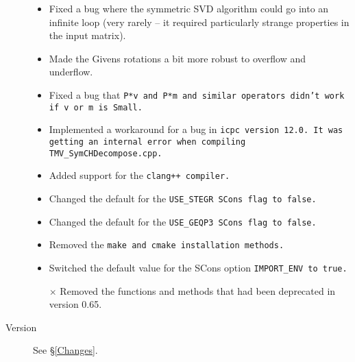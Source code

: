 \begin{description}
\begin{itemize}
\item
Fixed a bug where the symmetric SVD algorithm could go into an infinite loop (very rarely -- it required particularly strange properties in the input matrix).
 
\item
Made the Givens rotations a bit more robust to overflow and underflow.

\item
Fixed a bug that \tt{P*v} and \tt{P*m} and similar operators didn't work if 
\tt{v} or \tt{m} is \tt{Small}.

\item
Implemented a workaround for a bug in \tt{icpc} version 12.0.
It was getting an internal
error when compiling \tt{TMV\_SymCHDecompose.cpp}.  

\item 
Added support for the \tt{clang++} compiler.  

\item
Changed the default for the \tt{USE\_STEGR} SCons flag to \tt{false}.  

\item
Changed the default for the \tt{USE\_GEQP3} SCons flag to \tt{false}.

\item
Removed the \tt{make} and \tt{cmake} installation methods.  

\item
Switched the default value for the SCons option \tt{IMPORT\_ENV} to \tt{true}.

\item[$\times$]
Removed the functions and methods that had been deprecated in version 0.65.

\end{itemize}

\item[Version \tmvversion] See \S\ref{Changes}.

\end{description}
